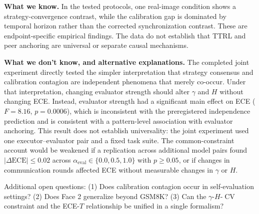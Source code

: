 \documentclass[11pt]{article}
\DeclareMathOperator{\CV}{CV}
\begin{document}
\textbf{What we know.} In the tested protocols, one real-image condition shows a strategy-convergence contrast, while the calibration gap is dominated by temporal horizon rather than the corrected synchronization contrast. These are endpoint-specific empirical findings. The data do not establish that TTRL and peer anchoring are universal or separate causal mechanisms.

\textbf{What we don't know, and alternative explanations.} The completed joint experiment directly tested the simpler interpretation that strategy consensus and calibration contagion are independent phenomena that merely co-occur. Under that interpretation, changing evaluator strength should alter $\gamma$ and $H$ without changing ECE. Instead, evaluator strength had a significant main effect on ECE ($F = 8.16$, $p = 0.0006$), which is inconsistent with the preregistered independence prediction and is consistent with a pattern-level association with evaluator anchoring. This result does not establish universality: the joint experiment used one executor--evaluator pair and a fixed task suite. The common-constraint account would be weakened if a replication across additional model pairs found $|\Delta\text{ECE}| \leq 0.02$ across $\alpha_{\text{eval}} \in \{0.0, 0.5, 1.0\}$ with $p \geq 0.05$, or if changes in communication rounds affected ECE without measurable changes in $\gamma$ or $H$.

Additional open questions: (1) Does calibration contagion occur in self-evaluation settings? (2) Does Face 2 generalize beyond GSM8K? (3) Can the $\gamma$-$H$-$\CV$ constraint and the ECE-$T$ relationship be unified in a single formalism?
\end{document}
